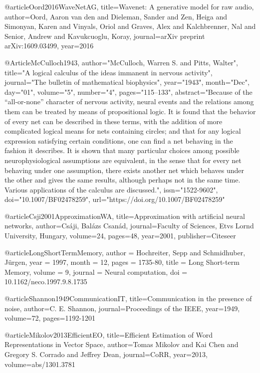 @article{Oord2016WaveNetAG,
  title={Wavenet: A generative model for raw audio},
  author={Oord, Aaron van den and Dieleman, Sander and Zen, Heiga and Simonyan, Karen and Vinyals, Oriol and Graves, Alex and Kalchbrenner, Nal and Senior, Andrew and Kavukcuoglu, Koray},
  journal={arXiv preprint arXiv:1609.03499},
  year={2016}
}

@Article{McCulloch1943,
author="McCulloch, Warren S.
and Pitts, Walter",
title="A logical calculus of the ideas immanent in nervous activity",
journal="The bulletin of mathematical biophysics",
year="1943",
month="Dec",
day="01",
volume="5",
number="4",
pages="115--133",
abstract="Because of the ``all-or-none'' character of nervous activity, neural events and the relations among them can be treated by means of propositional logic. It is found that the behavior of every net can be described in these terms, with the addition of more complicated logical means for nets containing circles; and that for any logical expression satisfying certain conditions, one can find a net behaving in the fashion it describes. It is shown that many particular choices among possible neurophysiological assumptions are equivalent, in the sense that for every net behaving under one assumption, there exists another net which behaves under the other and gives the same results, although perhaps not in the same time. Various applications of the calculus are discussed.",
issn="1522-9602",
doi="10.1007/BF02478259",
url="https://doi.org/10.1007/BF02478259"
}

@article{Csji2001ApproximationWA,
  title={Approximation with artificial neural networks},
  author={Cs{\'a}ji, Bal{\'a}zs Csan{\'a}d},
  journal={Faculty of Sciences, Etvs Lornd University, Hungary},
  volume={24},
  pages={48},
  year={2001},
  publisher={Citeseer}
}

@article{LongShortTermMemory,
author = {Hochreiter, Sepp and Schmidhuber, Jürgen},
year = {1997},
month = {12},
pages = {1735-80},
title = {Long Short-term Memory},
volume = {9},
journal = {Neural computation},
doi = {10.1162/neco.1997.9.8.1735}
}

@article{Shannon1949CommunicationIT,
  title={Communication in the presence of noise},
  author={C. E. Shannon},
  journal={Proceedings of the IEEE},
  year={1949},
  volume={72},
  pages={1192-1201}
}

@article{Mikolov2013EfficientEO,
  title={Efficient Estimation of Word Representations in Vector Space},
  author={Tomas Mikolov and Kai Chen and Gregory S. Corrado and Jeffrey Dean},
  journal={CoRR},
  year={2013},
  volume={abs/1301.3781}
}

